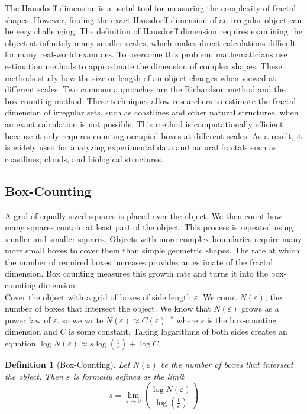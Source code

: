 \documentclass{article}
\newtheorem{definition}{Definition}
\begin{document}
The Hausdorff dimension is a useful tool for measuring the complexity of fractal shapes. However, finding the exact Hausdorff dimension of an irregular object can be very challenging. The definition of Hausdorff dimension requires examining the object at infinitely many smaller scales, which makes direct calculations difficult for many real-world examples. To overcome this problem, mathematicians use estimation methods to approximate the dimension of complex shapes. These methods study how the size or length of an object changes when viewed at different scales. Two common approaches are the Richardson method and the box-counting method. These techniques allow researchers to estimate the fractal dimension of irregular sets, such as coastlines and other natural structures, when an exact calculation is not possible. This method is computationally efficient because it only requires counting occupied boxes at different scales. As a result, it is widely used for analyzing experimental data and natural fractals such as coastlines, clouds, and biological structures.


\subsection{Box-Counting}

A grid of equally sized squares is placed over the object. We then count how many squares contain at least part of the object. This process is repeated using smaller and smaller squares. Objects with more complex boundaries require many more small boxes to cover them than simple geometric shapes. The rate at which the number of required boxes increases provides an estimate of the fractal dimension. Box counting measures this growth rate and turns it into the box-counting dimension. \\

Cover the object with a grid of boxes of side length $\varepsilon$. We count $N(\varepsilon)$, the number of boxes that intersect the object. We know that $N(\varepsilon)$ grows as a power law of $\varepsilon$, so we write $N(\varepsilon) \approx C(\varepsilon)^{-s}$ where $s$ is the box-counting dimension and $C$ is some constant. Taking logarithms of both sides creates an equation $\log N(\varepsilon) \approx s \log \left( \frac{1}{\varepsilon} \right) + \log C$.

\begin{definition}[Box-Counting]
    Let $N(\varepsilon)$ be the number of boxes that intersect the object. Then $s$ is formally defined as the limit
    $$s = \lim_{\varepsilon \to 0} \left( \frac{\log N(\varepsilon)}{\log (\frac{1}{\varepsilon})} \right) $$
\end{definition}
\end{document}
